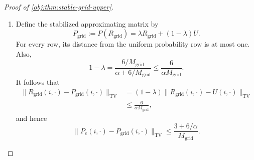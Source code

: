 \begin{proof}[Proof of \cref{obj:thm:stable-grid-upper}]
\begin{enumerate}
Define the rounded initial row, transition rows, and rewards by
\[
\nu_{\mathrm{grid}}:=\mathcal R_{\mathrm{grid}}(d_b),
\qquad
R_{\mathrm{grid}}(i,\cdot)
:=
\mathcal R_{\mathrm{grid}}(P_e(i,\cdot)),
\qquad
r_{\mathrm{grid}}(i)
:=
\frac{\lfloor M_{\mathrm{grid}}r_e(i)\rfloor}{M_{\mathrm{grid}}}.
\]
They satisfy
\[
\|\nu_{\mathrm{grid}}-d_b\|_{\mathrm{TV}}
\le\frac3{M_{\mathrm{grid}}},
\qquad
\max_i\|R_{\mathrm{grid}}(i,\cdot)-P_e(i,\cdot)\|_{\mathrm{TV}}
\le\frac3{M_{\mathrm{grid}}},
\]
\[
0\le r_{\mathrm{grid}}(i)\le1,
\qquad
0\le r_e(i)-r_{\mathrm{grid}}(i)
\le\frac1{M_{\mathrm{grid}}}.
\]
For each pair of rows, the triangle inequality gives
\[
\begin{aligned}
\|R_{\mathrm{grid}}(i,\cdot)-R_{\mathrm{grid}}(j,\cdot)\|_{\mathrm{TV}}
&\le
\|R_{\mathrm{grid}}(i,\cdot)-P_e(i,\cdot)\|_{\mathrm{TV}}\\
&\quad+
\|P_e(i,\cdot)-P_e(j,\cdot)\|_{\mathrm{TV}}\\
&\quad+
\|P_e(j,\cdot)-R_{\mathrm{grid}}(j,\cdot)\|_{\mathrm{TV}}\\
&\le\alpha+\frac6{M_{\mathrm{grid}}}.
\end{aligned}
\]
Taking the maximum over the row pair proves
\[
\delta(R_{\mathrm{grid}})
\le\alpha+\frac6{M_{\mathrm{grid}}},
\qquad
(\nu_{\mathrm{grid}},R_{\mathrm{grid}},r_{\mathrm{grid}})
\in\mathcal C_{M_{\mathrm{grid}}}.
\]

\item Define the stabilized approximating matrix by
\[
P_{\mathrm{grid}}
:=
P(R_{\mathrm{grid}})
=
\lambda R_{\mathrm{grid}}+(1-\lambda)U.
\]
For every row, its distance from the uniform probability row is at most one. Also,
\[
1-\lambda
=
\frac{6/M_{\mathrm{grid}}}{\alpha+6/M_{\mathrm{grid}}}
\le\frac6{\alpha M_{\mathrm{grid}}}.
\]
It follows that
\[
\begin{aligned}
\|R_{\mathrm{grid}}(i,\cdot)-P_{\mathrm{grid}}(i,\cdot)\|_{\mathrm{TV}}
&=
(1-\lambda)
\|R_{\mathrm{grid}}(i,\cdot)-U(i,\cdot)\|_{\mathrm{TV}}\\
&\le\frac6{\alpha M_{\mathrm{grid}}},
\end{aligned}
\]
and hence
\[
\|P_e(i,\cdot)-P_{\mathrm{grid}}(i,\cdot)\|_{\mathrm{TV}}
\le
\frac{3+6/\alpha}{M_{\mathrm{grid}}}.
\]


\end{enumerate}
\end{proof}
